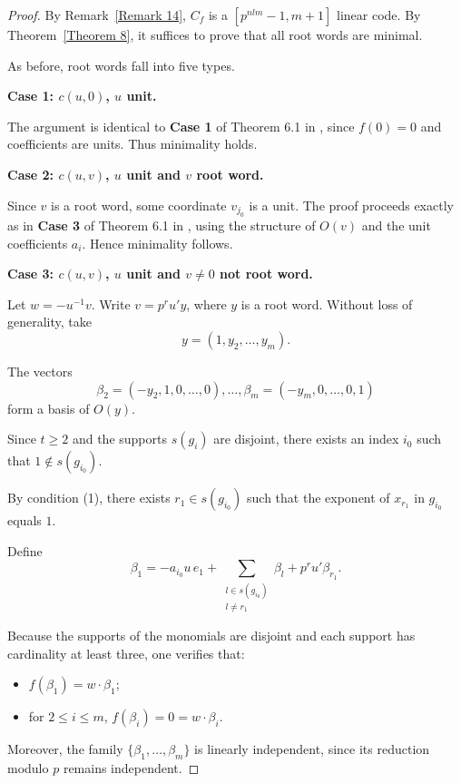 \documentclass[10pt]{article}
\theoremstyle{definition}
\begin{document}
\begin{proof}

By Remark~\ref{Remark 14},
$C_f$ is a $[p^{nlm}-1,m+1]$ linear code.
By Theorem~\ref{Theorem 8},
it suffices to prove that all root words are minimal.

As before, root words fall into five types.

\medskip
\noindent
\textbf{Case 1: $c(u,0)$, $u$ unit.}

The argument is identical to
{\bf Case 1} of Theorem 6.1 in \cite{WuLuCao},
since $f(0)=0$ and coefficients are units.
Thus minimality holds.

\medskip
\noindent
\textbf{Case 2: $c(u,v)$, $u$ unit and $v$ root word.}

Since $v$ is a root word,
some coordinate $v_{j_0}$ is a unit.
The proof proceeds exactly as in
{\bf Case 3} of Theorem 6.1 in \cite{WuLuCao},
using the structure of $O(v)$ and the unit coefficients $a_i$.
Hence minimality follows.

\medskip
\noindent
\textbf{Case 3: $c(u,v)$, $u$ unit and $v\neq 0$ not root word.}

Let $w=-u^{-1}v$.
Write $v=p^r u' y$, where $y$ is a root word.
Without loss of generality, take
\[
y=(1,y_2,\dots,y_m).
\]

The vectors
\[
\beta_2=(-y_2,1,0,\dots,0),\dots,
\beta_m=(-y_m,0,\dots,0,1)
\]
form a basis of $O(y)$.

Since $t\ge 2$ and the supports $s(g_i)$ are disjoint,
there exists an index $i_0$ such that $1\notin s(g_{i_0})$.

By condition (1),
there exists $r_1\in s(g_{i_0})$
such that the exponent of $x_{r_1}$ in $g_{i_0}$ equals $1$.

Define
\[
\beta_1=
-a_{i_0}u\, e_1
+
\sum_{\substack{l\in s(g_{i_0})\\ l\neq r_1}} \beta_l
+
p^r u' \beta_{r_1}.
\]

Because the supports of the monomials are disjoint
and each support has cardinality at least three,
one verifies that:

\begin{itemize}
\item $f(\beta_1)=w\cdot \beta_1$;
\item for $2\le i\le m$,
      $f(\beta_i)=0=w\cdot \beta_i$.
\end{itemize}

Moreover, the family
$\{\beta_1,\dots,\beta_m\}$
is linearly independent,
since its reduction modulo $p$
remains independent.


\end{proof}
\end{document}
